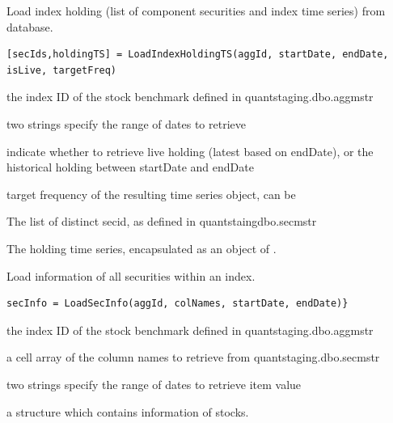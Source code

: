   Load index holding (list of component securities and index time series) from database.

\usage
   \begin{lstlisting}[numbers=none]
   [secIds,holdingTS] = LoadIndexHoldingTS(aggId, startDate, endDate, isLive, targetFreq)
   \end{lstlisting}
%
\inarg
   \begin{argdesc}
     \item[aggId] the index ID of the stock benchmark defined in quantstaging.dbo.aggmstr 
     \item[startDate/endDate]  two strings specify the range of dates to retrieve
	  \item[isLive] indicate whether to retrieve live holding (latest based on endDate), 
          or the historical holding between startDate  and endDate
	  \item[targetFreq] target frequency of the resulting time series object, can be
               
   \end{argdesc}
%        
\outarg 
   \begin{argdesc}    
		\item[secIds] The list of distinct secid, as defined in quantstaingdbo.secmstr
		\item[holdingTS]  The holding time series, encapsulated as an object of \myfints{}.
	 \end{argdesc}
   
  Load information of all securities within an index.

\usage
   \begin{lstlisting}[numbers=none]
   secInfo = LoadSecInfo(aggId, colNames, startDate, endDate)}
   \end{lstlisting}
%
\inarg
	\begin{argdesc}
	  \item[aggId] the index ID of the stock benchmark defined in quantstaging.dbo.aggmstr 
	  \item[colNames] a cell array of the column names to retrieve from quantstaging.dbo.secmstr
	  \item[startDate/endDate] two strings specify the range of dates to retrieve item value
   \end{argdesc}
\outarg
   \begin{argdesc}
  	  \item[secInfo] a structure which contains information of stocks. 
   \end{argdesc}

